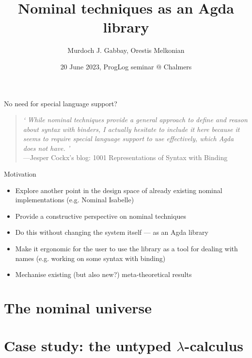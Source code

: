 \documentclass[aspectratio=169]{beamer}
\title{Nominal techniques as an Agda library}
\author{Murdoch J. Gabbay, \alert{Orestis Melkonian}}
\date{20 June 2023, ProgLog seminar @ Chalmers}
\newcommand\myblockquote[2]{%
  \blockquote{\hspace*{2em}\emph{`#1'}#2}\par}
\renewcommand\alert[1]{\textcolor{mLightBrown}{#1}}
\begin{document}
\AgdaNoSpaceAroundCode{}



\begin{center}
\maketitle
\end{center}

\begin{frame}{\alert{No need} for special language support?}
\myblockquote{\textit{
While nominal techniques provide a general approach to define and reason about syntax with binders, I actually hesitate to include it here because it seems to require special language support to use effectively, which Agda does not have.
}}{\\---Jesper Cockx's blog: 1001 Representations of Syntax with Binding}
\end{frame}

\begin{frame}{Motivation}
\begin{itemize}
\item Explore another \alert{point in the design space} of already existing nominal implementations (e.g. Nominal Isabelle)
\item Provide a \alert{constructive} perspective on nominal techniques
\item Do this \alert{without changing the system itself} --- as an Agda library
\item Make it \alert{ergonomic} for the user to use the library as a tool for dealing with names
(e.g. working on some syntax with binding)
\item Mechanise existing (but also new?) \alert{meta-theoretical results}
\end{itemize}
\end{frame}

\section{The nominal universe}






\section{Case study: the untyped $\lambda$-calculus}




\end{document}
